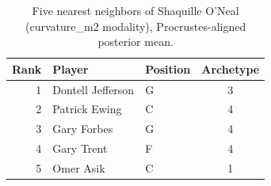 \begin{table}[htbp]
  \centering\small
  \begin{tabular}{rllc}
    \toprule
    Rank & Player & Position & Archetype \\
    \midrule
    1 & Dontell Jefferson & G & 3 \\
    2 & Patrick Ewing & C & 4 \\
    3 & Gary Forbes & G & 4 \\
    4 & Gary Trent & F & 4 \\
    5 & Omer Asik & C & 1 \\
    \bottomrule
  \end{tabular}
  \caption{Five nearest neighbors of Shaquille O'Neal (curvature_m2 modality), Procrustes-aligned posterior mean.}
  \label{tab:Shaquille_O_Neal_neighbors_curvature_m2}
\end{table}

